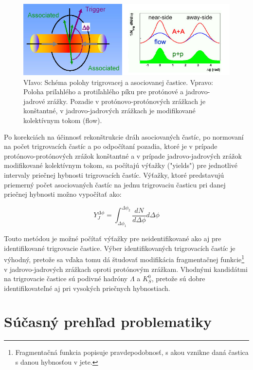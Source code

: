 \documentclass[thesismargins, thesislinespacing]{rnthesis}
\begin{document}
\begin{figure}[hbtp!]
	\begin{center}
		\includegraphics[width=\textwidth]{./Obrazky_praca/dijetcorrelations.png}
		\caption{Vľavo: Schéma polohy trigrovacej a asociovanej častice. Vpravo: Poloha priľahlého a protiľahlého píku pre protónové a jadrovo-jadrové zrážky. Pozadie v protónovo-protónových zrážkach je konštantné, v jadrovo-jadrových zrážkach je \-mo\-di\-fi\-ko\-va\-né kolektívnym tokom (flow).}
		\label{kor}
	\end{center}
\end{figure}

Po korekciách na účinnosť rekonštrukcie dráh asociovaných častíc, po normovaní na počet trigrovacích častíc a po odpočítaní pozadia, ktoré je v prípade protónovo-protónových zrážok konštantné a v prípade jadrovo-jadrových zrážok modifikované kolektívnym tokom, sa počítajú výťažky ("yields") pre jednotlivé intervaly priečnej hybnosti trigrovacích častíc. Výťažky, ktoré predstavujú priemerný počet asociovaných častíc na jednu trigrovaciu časticu pri danej priečnej hybnosti možno vypočítať ako:

\begin{equation}
Y_J^{\Delta\phi}=\int_{\Delta \phi_1}^{\Delta \phi_2} \frac{dN}{d\Delta \phi } d\Delta\phi 
\label{yield}
\end{equation} 

Touto metódou je možné počítať výťažky pre neidentifikované ako aj pre identifikované trigrovacie častice. Výber identifikovaných trigrovacích častíc je výhodný, pretože sa vďaka tomu dá študovať modifikácia fragmentačnej funkcie\footnote{Fragmentačná funkcia popisuje pravdepodobnosť, s akou vznikne daná častica s danou hybnosťou v jete.} v jadrovo-jadrových zrážkach oproti protónovým zrážkam. Vhodnými kandidátmi na trigrovacie častice sú podivné hadróny $\Lambda$ a $K^0_S$, pretože sú dobre identifikovateľné aj pri vysokých priečnych hybnostiach. 

\section{Súčasný prehľad problematiky}
\end{document}
